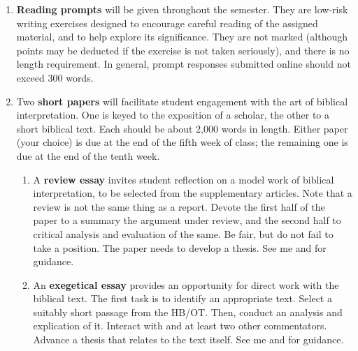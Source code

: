 \documentclass[titlepage]{article}
\begin{document}
\begin{enumerate}

	\item \textbf{Reading prompts} will be given throughout the
	semester. They are low-risk writing exercises designed to encourage
	careful reading of the assigned material, and to help explore its
	significance. They are not marked (although points may be deducted
	if the exercise is not taken seriously), and there is no length
	requirement. In general, prompt responses submitted online should
	not exceed 300 words.

	\item Two \textbf{short papers} will facilitate student engagement
	with the art of biblical interpretation. One is keyed to the
	exposition of a scholar, the other to a short biblical text. Each
	should be about 2,000 words in length. Either paper (your choice) is
	due at the end of the fifth week of class; the remaining one is due
	at the end of the tenth week.

	\begin{enumerate}

		\item A \textbf{review essay} invites student reflection on a
		model work of biblical interpretation, to be selected from the
		supplementary articles. Note that a review is not the same thing
		as a report. Devote the first half of the paper to a summary the
		argument under review, and the second half to critical analysis
		and evaluation of the same. Be fair, but do not fail to take a
		position. The paper needs to develop a thesis. See me and
		\cite[Chs 3, 5–7, 11]{rlgs} for guidance.

		\item An \textbf{exegetical essay} provides an opportunity for
		direct work with the biblical text. The first task is to
		identify an appropriate text. Select a suitably short passage
		from the HB/OT. Then, conduct an analysis and explication of it.
		Interact with \cite{hbfb} and at least two other commentators.
		Advance a thesis that relates to the text itself. See me and
		\cite[Chs 3, 5, 8, 11]{rlgs} for guidance.

	\end{enumerate}


\end{enumerate}
\end{document}
